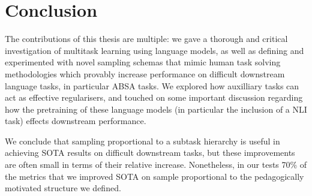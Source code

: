 \documentclass[11pt]{report}
\theoremstyle{Definition}
\theoremstyle{remark}
\begin{document}
\tableofcontents
\newpage \cleardoublepage

\setcounter{page}{1}
\listoftables

\newpage
{} 
\listoffigures


\mbox{}
\printnomenclature
\newpage

 
\newpage \cleardoublepage

 
\newpage \cleardoublepage

 
\newpage \cleardoublepage

 
\newpage \cleardoublepage

 
\newpage \cleardoublepage

\chapter{Conclusion}
The contributions of this thesis are multiple: we gave a thorough and critical investigation of multitask learning using language models, as well as defining and experimented with novel sampling schemas that mimic human task solving methodologies which provably increase performance on difficult downstream language tasks, in particular ABSA tasks. We explored how auxilliary tasks can act as effective regularisers, and touched on some important discussion regarding how the pretraining of these language models (in particular the inclusion of a NLI task) effects downstream performance. 

We conclude that sampling proportional to a subtask hierarchy is useful in achieving SOTA results on difficult downstream tasks, but these improvements are often small in terms of their relative increase. Nonetheless, in our tests 70\% of the metrics that we improved SOTA on sample proportional to the pedagogically motivated structure we defined.
\end{document}
